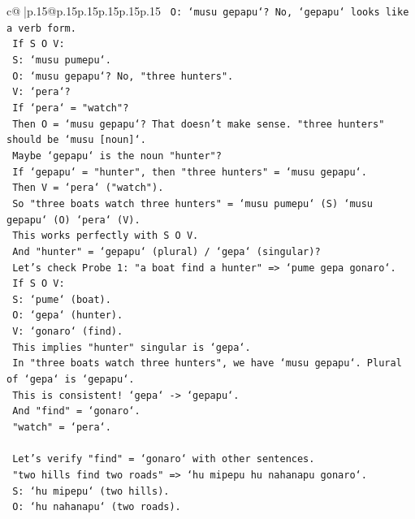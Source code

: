 \documentclass{article}
\begin{document}
{\begin{supertabular}{c@{$\;$}|p{.15\linewidth}@{}p{.15\linewidth}p{.15\linewidth}p{.15\linewidth}p{.15\linewidth}p{.15\linewidth}}
{{{\texttt{     O: `musu gepapu`? No, `gepapu` looks like a verb form.} \\
\texttt{     If S O V:} \\
\texttt{     S: `musu pumepu`.} \\
\texttt{     O: `musu gepapu`? No, "three hunters".} \\
\texttt{     V: `pera`?} \\
\texttt{     If `pera` = "watch"?} \\
\texttt{     Then O = `musu gepapu`? That doesn't make sense. "three hunters" should be `musu {[}noun{]}`.} \\
\texttt{     Maybe `gepapu` is the noun "hunter"?} \\
\texttt{     If `gepapu` = "hunter", then "three hunters" = `musu gepapu`.} \\
\texttt{     Then V = `pera` ("watch").} \\
\texttt{     So "three boats watch three hunters" = `musu pumepu` (S) `musu gepapu` (O) `pera` (V).} \\
\texttt{     This works perfectly with S O V.} \\
\texttt{     And "hunter" = `gepapu` (plural) / `gepa` (singular)?} \\
\texttt{     Let's check Probe 1: "a boat find a hunter" => `pume gepa gonaro`.} \\
\texttt{     If S O V:} \\
\texttt{     S: `pume` (boat).} \\
\texttt{     O: `gepa` (hunter).} \\
\texttt{     V: `gonaro` (find).} \\
\texttt{     This implies "hunter" singular is `gepa`.} \\
\texttt{     In "three boats watch three hunters", we have `musu gepapu`. Plural of `gepa` is `gepapu`.} \\
\texttt{     This is consistent! `gepa` {-}> `gepapu`.} \\
\texttt{     And "find" = `gonaro`.} \\
\texttt{     "watch" = `pera`.} \\
\\ 
\texttt{     Let's verify "find" = `gonaro` with other sentences.} \\
\texttt{     "two hills find two roads" => `hu mipepu hu nahanapu gonaro`.} \\
\texttt{     S: `hu mipepu` (two hills).} \\
\texttt{     O: `hu nahanapu` (two roads).} \\
}}}
\end{supertabular}}
\end{document}
